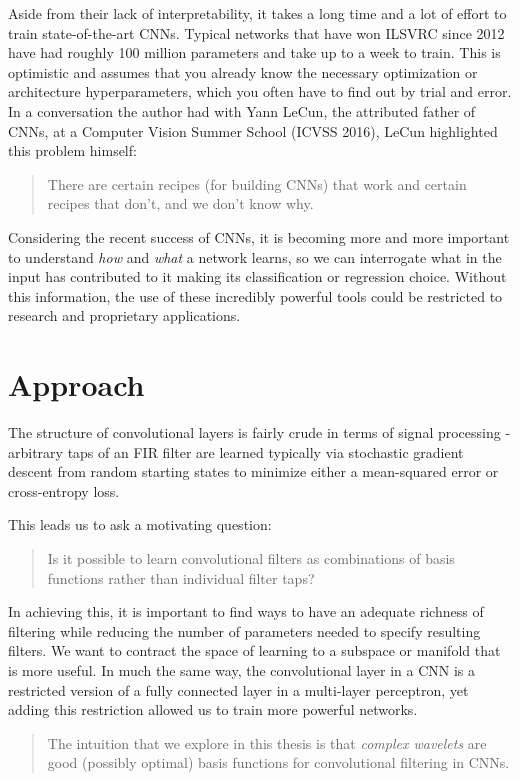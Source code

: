 Aside from their lack of interpretability, it takes a long time and a lot of
effort to train state-of-the-art CNNs. Typical networks that have won ILSVRC
since 2012 have had roughly 100 million parameters and take up to a week to train. This 
is optimistic and assumes that you already know the necessary optimization or
architecture hyperparameters, which you often have to find out by trial and error. 
In a conversation the author had with Yann LeCun, the attributed father of
CNNs, at a Computer Vision Summer School (ICVSS 2016), LeCun highlighted this problem
himself:
\begin{quote}
  There are certain recipes (for building CNNs) that work and certain recipes
  that don't, and we don't know why.
\end{quote}

Considering the recent success of CNNs, it is becoming more and more
important to understand \emph{how} and \emph{what} a network learns, so we can 
interrogate what in the input has contributed to it making its classification or regression choice.
Without this information, the use of these incredibly powerful tools could be
restricted to research and proprietary applications.

\section{Approach}
The structure of convolutional layers is fairly crude in terms of signal
processing - arbitrary taps of an FIR filter are learned typically via
stochastic gradient descent from random starting states to minimize either a
mean-squared error or cross-entropy loss. 

This leads us to ask a motivating question:
%
\begin{quote}
  Is it possible to learn convolutional filters as combinations of basis
  functions rather than individual filter taps?
\end{quote}

In achieving this, it is important to find ways to have an adequate
richness of filtering while reducing the number of parameters needed to specify resulting
filters. We want to contract the space of learning to a subspace or manifold that 
is more useful. In much the same way, the convolutional layer in a CNN is a restricted
version of a fully connected layer in a multi-layer perceptron, yet adding this
restriction allowed us to train more powerful networks. 

\begin{quote}
The intuition that we explore in this thesis is that \emph{complex wavelets} are
good (possibly optimal) basis functions for convolutional filtering in CNNs.
\end{quote}

